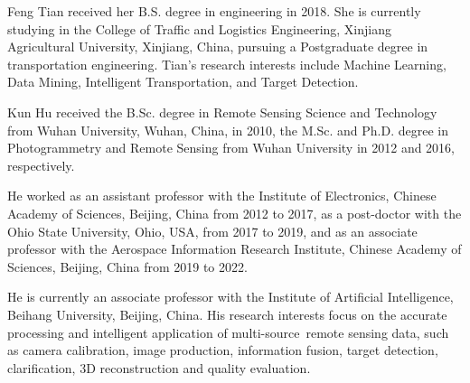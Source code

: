 \documentclass[lettersize,journal]{IEEEtran}
\begin{document}
\begin{IEEEbiography}{Feng Tian} received her B.S. degree in engineering in 2018. She is currently studying in the College of Traffic and Logistics Engineering, Xinjiang Agricultural University, Xinjiang, China, pursuing a Postgraduate degree in transportation engineering. Tian's research interests include Machine Learning, Data Mining, Intelligent Transportation, and Target Detection.
\end{IEEEbiography}

\begin{IEEEbiography}{Kun Hu} received the B.Sc. degree in Remote Sensing Science and Technology from Wuhan University, Wuhan, China, in 2010, the M.Sc. and Ph.D. degree in Photogrammetry and Remote Sensing from Wuhan University in 2012 and 2016, respectively.

He worked as an assistant professor with the Institute of Electronics, Chinese Academy of Sciences, Beijing, China from 2012 to 2017, as a post-doctor with the Ohio State University, Ohio, USA, from 2017 to 2019, and as an associate professor with the Aerospace Information Research Institute, Chinese Academy of Sciences, Beijing, China from 2019 to 2022. 

He is currently an associate professor with the Institute of Artificial Intelligence, Beihang University, Beijing, China. His research interests focus on the accurate processing and intelligent application of multi-source remote sensing data, such as camera calibration, image production, information fusion, target detection, clarification, 3D reconstruction and quality evaluation. 

\end{IEEEbiography}



\end{document}
